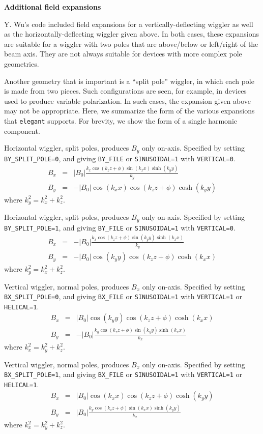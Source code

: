 {\bf Additional field expansions}

Y. Wu's code included field expansions for a vertically-deflecting
wiggler as well as the horizontally-deflecting wiggler given above.
In both cases, these expansions are suitable for a wiggler with two
poles that are above/below or left/right of the beam axis.  They are
not always suitable for devices with more complex pole geometries.

Another geometry that is important is a ``split pole'' wiggler, in which
each pole is made from two pieces.  Such configurations are seen, for example,
in devices used to produce variable polarization.  In such cases, the
expansion given above may not be appropriate.  Here, we summarize the form of the
various expansions that {\tt elegant} supports.  For brevity, we show the
form of a single harmonic component.

Horizontal wiggler, split poles, produces $B_y$ only on-axis.   Specified
by setting {\tt BY\_SPLIT\_POLE=0}, and giving {\tt BY\_FILE} or {\tt SINUSOIDAL=1} with {\tt VERTICAL=0}.
\begin{eqnarray}
B_x & = & \left|B_0\right| \frac{k_x \cos (k_z z + \phi) \sin (k_x x) \sinh (k_y y)}{k_y}\\
B_y & = & - \left|B_0\right| \cos (k_x x) \cos (k_z z + \phi) \cosh (k_y y)
\end{eqnarray}
where $k_y^2 = k_x^2 + k_z^2$.

Horizontal wiggler, split poles, produces $B_y$ only on-axis.   Specified
by setting {\tt BY\_SPLIT\_POLE=1}, and giving {\tt BY\_FILE} or {\tt SINUSOIDAL=1} with {\tt VERTICAL=0}.
\begin{eqnarray}
B_x & = & -\left|B_0\right| \frac{k_x \cos (k_z z + \phi) \sin (k_y y) \sinh (k_x x)}{k_y}\\
B_y & = & -\left|B_0\right| \cos (k_y y) \cos (k_z z + \phi) \cosh (k_x x)
\end{eqnarray}
where $k_y^2 = k_x^2 + k_z^2$.

Vertical wiggler, normal poles, produces $B_x$ only on-axis.   Specified
by setting {\tt BX\_SPLIT\_POLE=0}, and giving {\tt BX\_FILE} or {\tt SINUSOIDAL=1} with {\tt VERTICAL=1} or
{\tt HELICAL=1}.
\begin{eqnarray}
B_x & = & \left|B_0\right| \cos (k_y y) \cos (k_z z + \phi) \cosh (k_x x)\\
B_y & = & -\left|B_0\right| \frac{k_y \cos (k_z z + \phi) \sin (k_y y) \sinh (k_x x)}{k_x}
\end{eqnarray}
where $k_x^2 = k_y^2 + k_z^2$.

Vertical wiggler, normal poles, produces $B_x$ only on-axis.   Specified
by setting {\tt BX\_SPLIT\_POLE=1}, and giving {\tt BX\_FILE} or {\tt SINUSOIDAL=1} with {\tt VERTICAL=1} or
{\tt HELICAL=1}.
\begin{eqnarray}
B_x & = & \left|B_0\right| \cos (k_x x) \cos (k_z z + \phi) \cosh (k_y y)\\
B_y & = & \left|B_0\right| \frac{k_y \cos (k_z z + \phi) \sin (k_x x) \sinh (k_y y)}{k_x}
\end{eqnarray}
where $k_x^2 = k_y^2 + k_z^2$.
